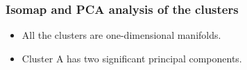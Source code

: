 \documentclass[svgnames, table, smaller]{beamer}
\begin{document}
\begin{frame}
  \frametitle{Isomap and PCA analysis of the clusters}
  \begin{itemize}
    \item All the clusters are one-dimensional manifolds.
    \item Cluster A has two significant principal components.
  \end{itemize}

  \begin{figure}[ht]
    \begin{center}
      \label{clutchpareto}
    \end{center}
  \end{figure}


\end{frame}
\end{document}
